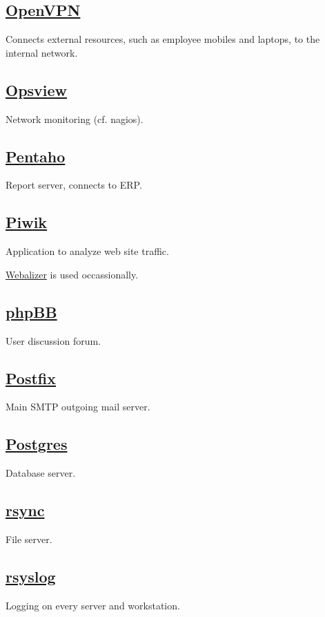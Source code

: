\subsection{\href{http://openvpn.net/}{OpenVPN}}
Connects external resources, such as employee mobiles and laptops, to the internal network.

\subsection{\href{http://www.opsview.com/}{Opsview}}
Network monitoring (cf. nagios).

\subsection{\href{http://community.pentaho.com/}{Pentaho}}
Report server, connects to ERP.

\subsection{\href{https://www.piwiki.org/}{Piwik}}
Application to analyze web site traffic.

\href{http://www.mrunix.net/webalizer/}{Webalizer} is used occassionally.

\subsection{\href{https://www.phpbb.com/}{phpBB}}
User discussion forum.

\subsection{\href{http://www.postfix.org/}{Postfix}}
Main SMTP outgoing mail server.

\subsection{\href{http://www.postgresql.org/}{Postgres}}
Database server.

\subsection{\href{http://rsync.samba.org/}{rsync}}
File server.

\subsection{\href{http://www.rsyslog.com/}{rsyslog}}
Logging on every server and workstation.

